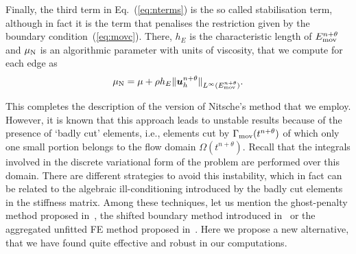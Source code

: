 \documentclass[11pt,a4paper,oneside,reqno]{amsart}
\newcommand{\Eq}[1]{(\ref{eq:#1})}
\def\u{{\bm u}}
\def\el{{\nonumber}}
\begin{document}
Finally, the third term in Eq.~\Eq{nterms} is the so called stabilisation term, although in fact it is the term that penalises the restriction given by the boundary condition~\Eq{movc}. There, $h_E$ is the characteristic length of $E_{\rm mov}^{n+\theta}$ and $\mu_{\rm N}$ is an algorithmic parameter with units of viscosity, that we compute for each edge as
\begin{align}
\mu_{\rm N} = \mu + \rho  h_E \Vert \u_h^{n+\theta} %
\Vert_{L^\infty(E^{n+\theta}_{\rm mov})}.\el
\end{align}

This completes the description of the version of Nitsche's method that we employ. However, it is known that this approach leads to unstable results because of the presence of `badly cut' elements, i.e., elements cut by $\Gamma_{\rm mov} (t^{n+\theta})$ of which only one small portion belongs to the flow domain $\Omega(t^{n+\theta})$. Recall that the integrals involved in the discrete variational form of the problem are performed over this domain. There are different strategies to avoid this instability, which in fact can be related to the algebraic ill-conditioning introduced by the badly cut elements in the stiffness matrix. Among these techniques, let us mention the ghost-penalty method proposed in~\cite{burman-hansbo-2012-1}, the shifted boundary method introduced in~\cite{main-scovazzi-2018} or the aggregated unfitted FE method proposed in~\cite{badia-et-al-2021}. Here we propose a new alternative, that we have found quite effective and robust in our computations. 
\end{document}
